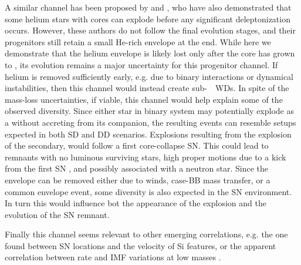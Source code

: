 \documentclass[../../main/thesis_msc.tex]{subfiles}
\begin{document}
A similar \ia channel has  been proposed by \cite{waldman2006a} and \cite{waldman2008}, who have also demonstrated that some helium stars with \one cores can explode before any significant deleptonization occurs. However, these authors do not follow the final evolution stages, and their progenitors still retain a small He-rich envelope at the end. While here we demonstrate that the helium envelope is  likely lost only  after the core has grown to \mch, its evolution remains a major uncertainty for this progenitor channel. If helium is removed sufficiently early, e.g. due to binary interactions or dynamical instabilities, then this channel would instead create  sub-\mch\ \one\ WDs. 
In spite of the mass-loss uncertainties, if viable, this channel would help explain some of the observed \ia diversity. Since either star in binary system may potentially explode as a \ia without accreting from its  companion, the resulting events can resemble setups expected in both SD and DD scenarios. Explosions resulting from the explosion of the secondary, would follow a first core-collapse SN. This could lead to \ia remnants with no luminous surviving stars, high proper motions due to a kick from the first SN \cite[like the Kepler remnant,][]{Chiotellis:2011jy}, and possibly associated with a neutron star. 
Since the  envelope can be removed either due to winds, case-BB mass transfer, or a common envelope event, some diversity is also expected in the SN environment. In turn this would influence bot the appearance of the explosion and the evolution of the SN remnant. 

Finally this channel seems relevant to other emerging correlations, e.g. the one found between SN locations and the velocity of Si features, or the apparent correlation between \ia rate and IMF variations at low masses \citep{Maoz:2013hna}.

	

	
\end{document}
